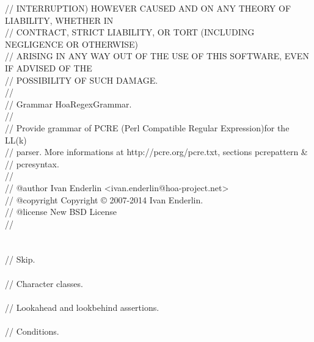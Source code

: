 \begin{bigbigpre}
// INTERRUPTION) HOWEVER CAUSED AND ON ANY THEORY OF LIABILITY, WHETHER IN \\
// CONTRACT, STRICT LIABILITY, OR TORT (INCLUDING NEGLIGENCE OR OTHERWISE) \\
// ARISING IN ANY WAY OUT OF THE USE OF THIS SOFTWARE, EVEN IF ADVISED OF THE \\
// POSSIBILITY OF SUCH DAMAGE. \\
// \\
// Grammar \bslash{}Hoa\bslash{}Regex\bslash{}Grammar. \\
// \\
// Provide grammar of PCRE (Perl Compatible Regular Expression)for the LL(k) \\
// parser. More informations at http://pcre.org/pcre.txt, sections pcrepattern & \\
// pcresyntax. \\
// \\
// @author     Ivan Enderlin <ivan.enderlin@hoa-project.net> \\
// @copyright  Copyright © 2007-2014 Ivan Enderlin. \\
// @license    New BSD License \\
// \\
 \\
 \\
// Skip. \\
 \\
// Character classes. \\
 \\
// Lookahead and lookbehind assertions. \\
 \\
// Conditions. \\

\end{bigbigpre}

